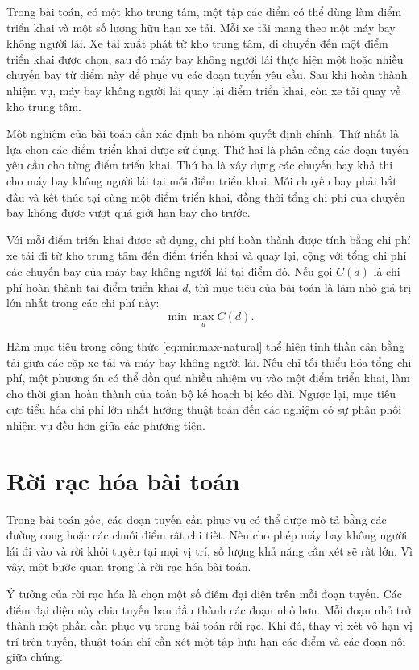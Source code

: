 Trong bài toán, có một kho trung tâm, một tập các điểm có thể dùng làm điểm triển khai và một số lượng hữu hạn xe tải. Mỗi xe tải mang theo một máy bay không người lái. Xe tải xuất phát từ kho trung tâm, di chuyển đến một điểm triển khai được chọn, sau đó máy bay không người lái thực hiện một hoặc nhiều chuyến bay từ điểm này để phục vụ các đoạn tuyến yêu cầu. Sau khi hoàn thành nhiệm vụ, máy bay không người lái quay lại điểm triển khai, còn xe tải quay về kho trung tâm.

Một nghiệm của bài toán cần xác định ba nhóm quyết định chính. Thứ nhất là lựa chọn các điểm triển khai được sử dụng. Thứ hai là phân công các đoạn tuyến yêu cầu cho từng điểm triển khai. Thứ ba là xây dựng các chuyến bay khả thi cho máy bay không người lái tại mỗi điểm triển khai. Mỗi chuyến bay phải bắt đầu và kết thúc tại cùng một điểm triển khai, đồng thời tổng chi phí của chuyến bay không được vượt quá giới hạn bay cho trước.

Với mỗi điểm triển khai được sử dụng, chi phí hoàn thành được tính bằng chi phí xe tải đi từ kho trung tâm đến điểm triển khai và quay lại, cộng với tổng chi phí các chuyến bay của máy bay không người lái tại điểm đó. Nếu gọi $C(d)$ là chi phí hoàn thành tại điểm triển khai $d$, thì mục tiêu của bài toán là làm nhỏ giá trị lớn nhất trong các chi phí này:
\begin{equation}
    \min \max_{d} C(d).
    \label{eq:minmax-natural}
\end{equation}

Hàm mục tiêu trong công thức \eqref{eq:minmax-natural} thể hiện tinh thần cân bằng tải giữa các cặp xe tải và máy bay không người lái. Nếu chỉ tối thiểu hóa tổng chi phí, một phương án có thể dồn quá nhiều nhiệm vụ vào một điểm triển khai, làm cho thời gian hoàn thành của toàn bộ kế hoạch bị kéo dài. Ngược lại, mục tiêu cực tiểu hóa chi phí lớn nhất hướng thuật toán đến các nghiệm có sự phân phối nhiệm vụ đều hơn giữa các phương tiện.

\section{Rời rạc hóa bài toán}

Trong bài toán gốc, các đoạn tuyến cần phục vụ có thể được mô tả bằng các đường cong hoặc các chuỗi điểm rất chi tiết. Nếu cho phép máy bay không người lái đi vào và rời khỏi tuyến tại mọi vị trí, số lượng khả năng cần xét sẽ rất lớn. Vì vậy, một bước quan trọng là rời rạc hóa bài toán.

Ý tưởng của rời rạc hóa là chọn một số điểm đại diện trên mỗi đoạn tuyến. Các điểm đại diện này chia tuyến ban đầu thành các đoạn nhỏ hơn. Mỗi đoạn nhỏ trở thành một phần cần phục vụ trong bài toán rời rạc. Khi đó, thay vì xét vô hạn vị trí trên tuyến, thuật toán chỉ cần xét một tập hữu hạn các điểm và các đoạn nối giữa chúng.

